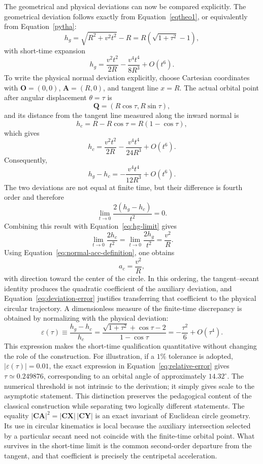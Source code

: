 \documentclass[preprint,12pt,3p,nopreprintline]{elsarticle}
\newcommand{\pt}[1]{\mathbf{#1}}
\newcommand{\seglen}[1]{\lvert\mathbf{#1}\rvert}
\newcommand{\be}{\begin{equation}}
\newcommand{\ee}{\end{equation}}
\numberwithin{equation}{section}
\theoremstyle{remark}
\begin{document}
The geometrical and physical deviations can now be compared explicitly. The geometrical deviation follows exactly from Equation~\eqref{eqtheo1}, or equivalently from Equation~\eqref{pytha}:
\be
h_g=\sqrt{R^2+v^2t^2}-R=R\left(\sqrt{1+\tau^2}-1\right),
\label{eq:hg-exact}
\ee
with short-time expansion
\be
h_g=\frac{v^2t^2}{2R}-\frac{v^4t^4}{8R^3}+O(t^6).
\label{eq:hg-expansion}
\ee
To write the physical normal deviation explicitly, choose Cartesian coordinates with $\pt{O}=(0,0)$, $\pt{A}=(R,0)$, and tangent line $x=R$. The actual orbital point after angular displacement $\theta=\tau$ is
\be
\pt{Q}=(R\cos\tau,R\sin\tau),
\label{eq:Q-coordinate}
\ee
and its distance from the tangent line measured along the inward normal is
\be
h_c=R-R\cos\tau=R(1-\cos\tau),
\label{eq:hc-exact}
\ee
which gives
\be
h_c=\frac{v^2t^2}{2R}-\frac{v^4t^4}{24R^3}+O(t^6).
\label{eq:hc-expansion}
\ee
Consequently,
\be
h_g-h_c=-\frac{v^4t^4}{12R^3}+O(t^6).
\label{eq:deviation-error}
\ee
The two deviations are not equal at finite time, but their difference is fourth order and therefore
\be
\lim_{t\to0}\frac{2(h_g-h_c)}{t^2}=0.
\ee
Combining this result with Equation~\eqref{eq:hg-limit} gives
\be
\lim_{t\to0}\frac{2h_c}{t^2}=\lim_{t\to0}\frac{2h_g}{t^2}=\frac{v^2}{R}.
\label{eq:local-equivalence}
\ee
Using Equation~\eqref{eq:normal-acc-definition}, one obtains
\be
a_c=\frac{v^2}{R},
\ee
with direction toward the center of the circle. In this ordering, the tangent--secant identity produces the quadratic coefficient of the auxiliary deviation, and Equation~\eqref{eq:deviation-error} justifies transferring that coefficient to the physical circular trajectory. A dimensionless measure of the finite-time discrepancy is obtained by normalizing with the physical deviation:
\be
\varepsilon(\tau)\equiv\frac{h_g-h_c}{h_c}=\frac{\sqrt{1+\tau^2}+\cos\tau-2}{1-\cos\tau}=-\frac{\tau^2}{6}+O(\tau^4).
\label{eq:relative-error}
\ee
This expression makes the short-time qualification quantitative without changing the role of the construction. For illustration, if a $1\%$ tolerance is adopted, $|\varepsilon(\tau)|=0.01$, the exact expression in Equation~\eqref{eq:relative-error} gives $\tau\simeq0.249876$, corresponding to an orbital angle of approximately $14.32^{\circ}$. The numerical threshold is not intrinsic to the derivation; it simply gives scale to the asymptotic statement. This distinction preserves the pedagogical content of the classical construction while separating two logically different statements. The equality $\seglen{CA}^{2}=\seglen{CX}\,\seglen{CY}$ is an exact invariant of Euclidean circle geometry. Its use in circular kinematics is local because the auxiliary intersection selected by a particular secant need not coincide with the finite-time orbital point. What survives in the short-time limit is the common second-order departure from the tangent, and that coefficient is precisely the centripetal acceleration.
\end{document}
